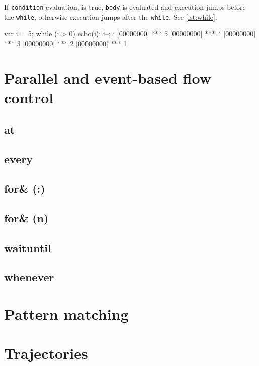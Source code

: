 If \lstinline|condition| evaluation, is true, \lstinline|body| is
evaluated and execution jumps before the \lstinline|while|, otherwise execution
jumps after the \lstinline|while|. See \autoref{lst:while}.

\begin{urbiscript}[caption=The \lstinline|while| construct, label=lst:while,
  float=\floatpos]
  var i = 5;
  while (i > 0)
  {
    echo(i);
    i--;
  };
  [00000000] *** 5
  [00000000] *** 4
  [00000000] *** 3
  [00000000] *** 2
  [00000000] *** 1
\end{urbiscript}

\FloatBarrier
\section{Parallel and event-based flow control}

\subsection{at}
\subsection{every}
\subsection{for\& (:)}
\subsection{for\& (n)}
\subsection{waituntil}
\subsection{whenever}

\FloatBarrier
\section{Pattern matching}
\FloatBarrier
\section{Trajectories}

